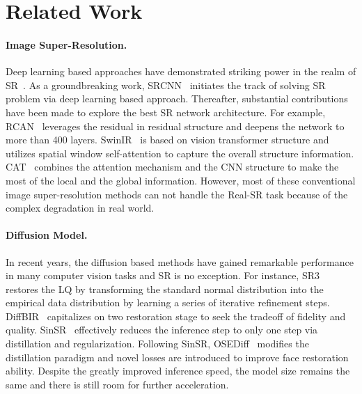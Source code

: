 \section{Related Work}
\paragraph{Image Super-Resolution.} 
Deep learning based approaches have demonstrated striking power in the realm of SR~\cite{ECCV2014LearningDong,luo2022lattice,wang2021real,Lim_2017_CVPR_Workshops,chen2023dual}.
As a groundbreaking work, SRCNN~\cite{ECCV2014LearningDong} initiates the track of solving SR problem via deep learning based approach.
Thereafter, substantial contributions have been made to explore the best SR network architecture.
For example, RCAN~\cite{zhang2018image} leverages the residual in residual structure and deepens the network to more than 400 layers.
SwinIR~\cite{liang2021swinir} is based on vision transformer structure and utilizes spatial window self-attention to capture the overall structure information.
CAT~\cite{chen2022cross} combines the attention mechanism and the CNN structure to make the most of the local and the global information.
However, most of these conventional image super-resolution methods can not handle the Real-SR task because of the complex degradation in real world.

\vspace{-4mm}
\paragraph{Diffusion Model.} 
In recent years, the diffusion based methods have gained remarkable performance in many computer vision tasks and SR is no exception.
For instance, SR3~\cite{saharia2022image} restores the LQ by transforming the standard normal distribution into the empirical data distribution by learning a series of iterative refinement steps.
DiffBIR~\cite{lin2024diffbir} capitalizes on two restoration stage to seek the tradeoff of fidelity and quality.
SinSR~\cite{wang2024sinsr} effectively reduces the inference step to only one step via distillation and regularization.
Following SinSR, OSEDiff~\cite{wu2024one} modifies the distillation paradigm and novel losses are introduced to improve face restoration ability.
Despite the greatly improved inference speed, the model size remains the same and there is still room for further acceleration.



\vspace{-4mm}
